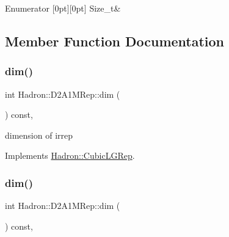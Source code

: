\begin{DoxyEnumFields}{Enumerator}
[0pt][0pt]{}\mbox{\label{structHadron_1_1D2A1MRep_a8c44116465a5efcd6b6cfe1cda238abfa02ba0ed5b047cc4d98ce5ce24353d74b}} 
Size\+\_\+t&\\
\hline

\end{DoxyEnumFields}


\subsection{Member Function Documentation}
\mbox{\label{structHadron_1_1D2A1MRep_a2a6e259c17f5c9b6c35271b8b25ecfab}} 
\subsubsection{\texorpdfstring{dim()}{dim()}\hspace{0.1cm}{\footnotesize\ttfamily [1/3]}}
{\footnotesize\ttfamily int Hadron\+::\+D2\+A1\+M\+Rep\+::dim (\begin{DoxyParamCaption}{ }\end{DoxyParamCaption}) const\hspace{0.3cm}{\ttfamily [inline]}, {\ttfamily [virtual]}}

dimension of irrep 

Implements \mbox{\hyperlink{structHadron_1_1CubicLGRep_a3acbaea26503ed64f20df693a48e4cdd}{Hadron\+::\+Cubic\+L\+G\+Rep}}.

\mbox{\label{structHadron_1_1D2A1MRep_a2a6e259c17f5c9b6c35271b8b25ecfab}} 
\subsubsection{\texorpdfstring{dim()}{dim()}\hspace{0.1cm}{\footnotesize\ttfamily [2/3]}}
{\footnotesize\ttfamily int Hadron\+::\+D2\+A1\+M\+Rep\+::dim (\begin{DoxyParamCaption}{ }\end{DoxyParamCaption}) const\hspace{0.3cm}{\ttfamily [inline]}, {\ttfamily [virtual]}}

